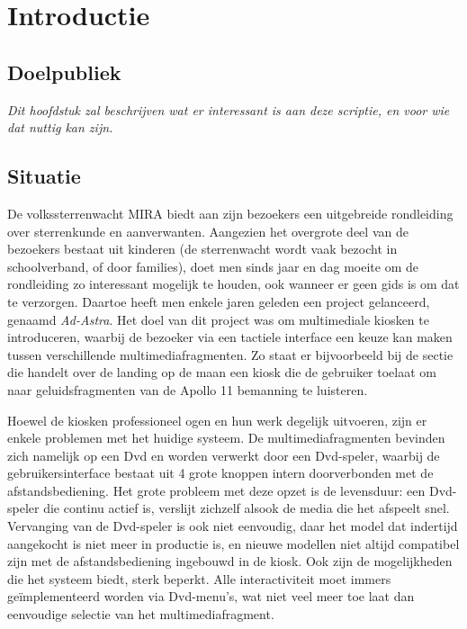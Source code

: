 \part{Introductie}
\label{introductie}


%
%

\chapter{Doelpubliek}
\label{introductie:doelpubliek}

\textit{Dit hoofdstuk zal beschrijven wat er interessant is aan deze scriptie, en voor wie dat nuttig kan zijn.}


%
%

\chapter{Situatie}
\label{introductie:situatie}

De volkssterrenwacht MIRA biedt aan zijn bezoekers een uitgebreide rondleiding over sterrenkunde en aanverwanten. Aangezien het overgrote deel van de bezoekers bestaat uit kinderen (de sterrenwacht wordt vaak bezocht in schoolverband, of door families), doet men sinds jaar en dag moeite om de rondleiding zo interessant mogelijk te houden, ook wanneer er geen gids is om dat te verzorgen. Daartoe heeft men enkele jaren geleden een project gelanceerd, genaamd \emph{Ad-Astra}. Het doel van dit project was om multimediale kiosken te introduceren, waarbij de bezoeker via een tactiele interface een keuze kan maken tussen verschillende multimediafragmenten. Zo staat er bijvoorbeeld bij de sectie die handelt over de landing op de maan een kiosk die de gebruiker toelaat om naar geluidsfragmenten van de Apollo 11 bemanning te luisteren.

Hoewel de kiosken professioneel ogen en hun werk degelijk uitvoeren, zijn er enkele problemen met het huidige systeem. De multimediafragmenten bevinden zich namelijk op een Dvd en worden verwerkt door een Dvd-speler, waarbij de gebruikersinterface bestaat uit 4 grote knoppen intern doorverbonden met de afstandsbediening.
Het grote probleem met deze opzet is de levensduur: een Dvd-speler die continu actief is, verslijt zichzelf alsook de media die het afspeelt snel. Vervanging van de Dvd-speler is ook niet eenvoudig, daar het model dat indertijd aangekocht is niet meer in productie is, en nieuwe modellen niet altijd compatibel zijn met de afstandsbediening ingebouwd in de kiosk.
Ook zijn de mogelijkheden die het systeem biedt, sterk beperkt. Alle interactiviteit moet immers geïmplementeerd worden via Dvd-menu's, wat niet veel meer toe laat dan eenvoudige selectie van het multimediafragment.

